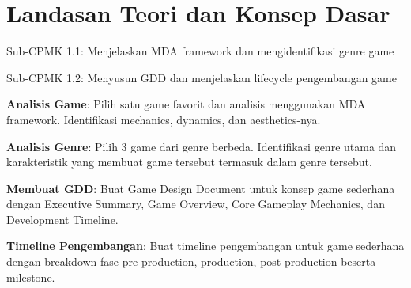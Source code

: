 \documentclass[../main]{subfiles}
\begin{document}
\chapter{Landasan Teori dan Konsep Dasar}

\begin{subcpmk}
  \item Sub-CPMK 1.1: Menjelaskan MDA framework dan mengidentifikasi genre game
  \item Sub-CPMK 1.2: Menyusun GDD dan menjelaskan lifecycle pengembangan game
\end{subcpmk}







\begin{aktivitas}
  \item \textbf{Analisis Game}: Pilih satu game favorit dan analisis menggunakan MDA framework. Identifikasi mechanics, dynamics, dan aesthetics-nya.
  
  \item \textbf{Analisis Genre}: Pilih 3 game dari genre berbeda. Identifikasi genre utama dan karakteristik yang membuat game tersebut termasuk dalam genre tersebut.
  
  \item \textbf{Membuat GDD}: Buat Game Design Document untuk konsep game sederhana dengan Executive Summary, Game Overview, Core Gameplay Mechanics, dan Development Timeline.
  
  \item \textbf{Timeline Pengembangan}: Buat timeline pengembangan untuk game sederhana dengan breakdown fase pre-production, production, post-production beserta milestone.
\end{aktivitas}

\end{document}
